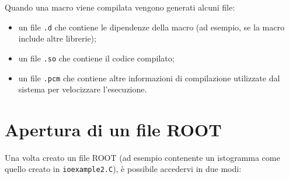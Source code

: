 \documentclass[10pt]{article}
\newcommand{\ttt}{\texttt}
\begin{document}
Quando una macro viene compilata vengono generati alcuni file:

\begin{itemize}
    \item un file \ttt{.d} che contiene le dipendenze della macro (ad esempio, se la macro include altre librerie);
    \item un file \ttt{.so} che contiene il codice compilato;
    \item un file \ttt{.pcm} che contiene altre informazioni di compilazione utilizzate dal sistema per velocizzare l'esecuzione.
\end{itemize}


\newpage
\section{Apertura di un file ROOT}
Una volta creato un file ROOT (ad esempio contenente un istogramma come quello creato in \ttt{ioexample2.C}), è possibile accedervi in due modi:
\end{document}
